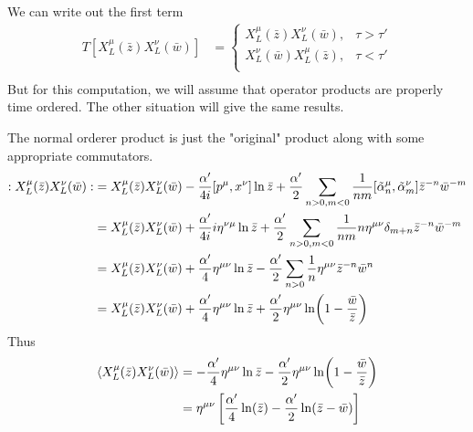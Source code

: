 \begin{enumerate}[label=(\alph*)]
		We can write out the first term
		\begin{align*}
			T[X_L^\mu(\bar{z}) X_L^\nu (\bar{w})]&= 
\begin{cases}
X_L^\mu(\bar{z}) X_L^\nu (\bar{w}), & \tau > \tau' \\
X_L^\nu (\bar{w}) X_L^\mu(\bar{z}), & \tau < \tau' \\
\end{cases}\\
		\end{align*}
		But for this computation, we will assume that operator products are properly time ordered. The other situation will give the same results.

		The normal orderer product is just the "original" product along with some appropriate commutators.
		\begin{align*}
		:X_L^\mu(\bar{z}) X_L^\nu (\bar{w}):	&= X_L^\mu(\bar{z}) X_L^\nu (\bar{w}) - \frac{\alpha'}{4i} \comm{p^\mu}{x^\nu} \ln{\bar{z}} + \frac{\alpha'}{2} \sum_{n>0, m<0} \frac{1}{nm} \comm{\tilde\alpha^\mu_n}{\tilde{\alpha}^\nu_m} \bar{z}^{-n} \bar{w}^{-m} \\
															&= X_L^\mu(\bar{z}) X_L^\nu (\bar{w}) + \frac{\alpha'}{4i} i\eta^{\nu\mu} \ln{\bar{z}} + \frac{\alpha'}{2} \sum_{n>0, m<0} \frac{1}{nm} n \eta^{\mu\nu} \delta_{m+n} \bar{z}^{-n} \bar{w}^{-m}\\
																&= X_L^\mu(\bar{z}) X_L^\nu (\bar{w}) + \frac{\alpha'}{4} \eta^{\mu\nu} \ln{\bar{z}} - \frac{\alpha'}{2} \sum_{n>0} \frac{1}{n} \eta^{\mu\nu} \bar{z}^{-n} \bar{w}^{n} \\
																&= X_L^\mu(\bar{z}) X_L^\nu (\bar{w}) + \frac{\alpha'}{4} \eta^{\mu\nu} \ln{\bar{z}} + \frac{\alpha'}{2} \eta^{\mu\nu} \ln(1-\frac{\bar{w}}{\bar{z}}) \\
		\end{align*}
		Thus 
		\begin{align}
			\braket{X_L^\mu(\bar{z}) X_L^\nu (\bar{w})}	&= - \frac{\alpha'}{4} \eta^{\mu\nu} \ln{\bar{z}} - \frac{\alpha'}{2} \eta^{\mu\nu} \ln(1-\frac{\bar{w}}{\bar{z}}) \notag \\
																		&= \eta^{\mu\nu} \left[ \frac{\alpha'}{4} \ln(\bar{z}) - \frac{\alpha'}{2} \ln(\bar{z}-\bar{w}) \right]
		\end{align}
		

\end{enumerate}
